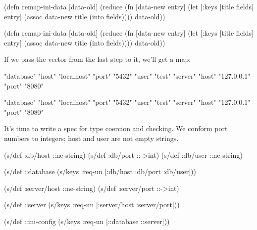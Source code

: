 \ifx\DEVICETYPE\MOBILE

\begin{english}
  \begin{clojure}
(defn remap-ini-data [data-old]
  (reduce
   (fn [data-new entry]
     (let [{:keys [title fields]} entry]
       (assoc data-new
         title (into {} fields))))
   {}
   data-old))
  \end{clojure}
\end{english}

\else

\begin{english}
  \begin{clojure}
(defn remap-ini-data [data-old]
  (reduce
   (fn [data-new entry]
     (let [{:keys [title fields]} entry]
       (assoc data-new title (into {} fields))))
   {}
   data-old))
  \end{clojure}
\end{english}

\fi

\noindent
If we pass the vector from the last step to it, we'll get a map:

\ifx\DEVICETYPE\MOBILE

\begin{english}
  \begin{clojure}
{"database" {"host" "localhost"
             "port" "5432"
             "user" "test"}
 "server" {"host" "127.0.0.1"
           "port" "8080"}}
  \end{clojure}
\end{english}

\else

\begin{english}
  \begin{clojure}
{"database" {"host" "localhost" "port" "5432" "user" "test"}
 "server" {"host" "127.0.0.1" "port" "8080"}}
  \end{clojure}
\end{english}

\fi

It's time to write a spec for type coercion and checking. We conform port numbers to integers; host and user are not empty strings.

\ifx\DEVICETYPE\MOBILE

\begin{english}
  \begin{clojure}
(s/def :db/host ::ne-string)
(s/def :db/port ::->int)
(s/def :db/user ::ne-string)

(s/def ::database
  (s/keys :req-un
    [:db/host :db/port :db/user]))

(s/def :server/host ::ne-string)
(s/def :server/port ::->int)

(s/def ::server
  (s/keys :req-un
    [:server/host :server/port]))

(s/def ::ini-config
  (s/keys :req-un [::database ::server]))
  \end{clojure}
\end{english}

